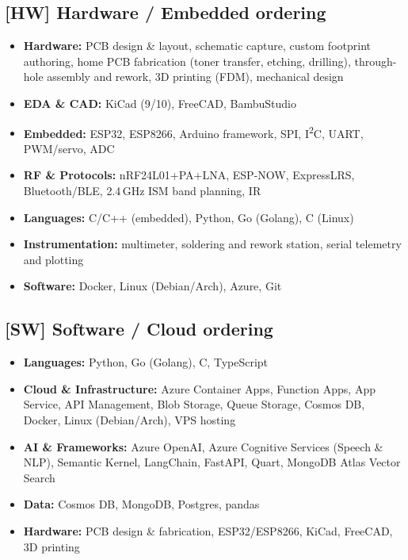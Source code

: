 \documentclass[10pt,a4paper]{article}
\begin{document}
\subsection*{[HW] Hardware / Embedded ordering}
\begin{itemize}
    \item \textbf{Hardware:} PCB design \& layout, schematic capture, custom footprint authoring, home PCB fabrication (toner transfer, etching, drilling), through-hole assembly and rework, 3D printing (FDM), mechanical design
    \item \textbf{EDA \& CAD:} KiCad (9/10), FreeCAD, BambuStudio
    \item \textbf{Embedded:} ESP32, ESP8266, Arduino framework, SPI, I\textsuperscript{2}C, UART, PWM/servo, ADC
    \item \textbf{RF \& Protocols:} nRF24L01+PA+LNA, ESP-NOW, ExpressLRS, Bluetooth/BLE, 2.4\,GHz ISM band planning, IR
    \item \textbf{Languages:} C/C++ (embedded), Python, Go (Golang), C (Linux)
    \item \textbf{Instrumentation:} multimeter, soldering and rework station, serial telemetry and plotting
    \item \textbf{Software:} Docker, Linux (Debian/Arch), Azure, Git
\end{itemize}

\subsection*{[SW] Software / Cloud ordering}
\begin{itemize}
    \item \textbf{Languages:} Python, Go (Golang), C, TypeScript
    \item \textbf{Cloud \& Infrastructure:} Azure Container Apps, Function Apps, App Service, API Management, Blob Storage, Queue Storage, Cosmos DB, Docker, Linux (Debian/Arch), VPS hosting
    \item \textbf{AI \& Frameworks:} Azure OpenAI, Azure Cognitive Services (Speech \& NLP), Semantic Kernel, LangChain, FastAPI, Quart, MongoDB Atlas Vector Search
    \item \textbf{Data:} Cosmos DB, MongoDB, Postgres, pandas
    \item \textbf{Hardware:} PCB design \& fabrication, ESP32/ESP8266, KiCad, FreeCAD, 3D printing
\end{itemize}
\end{document}
